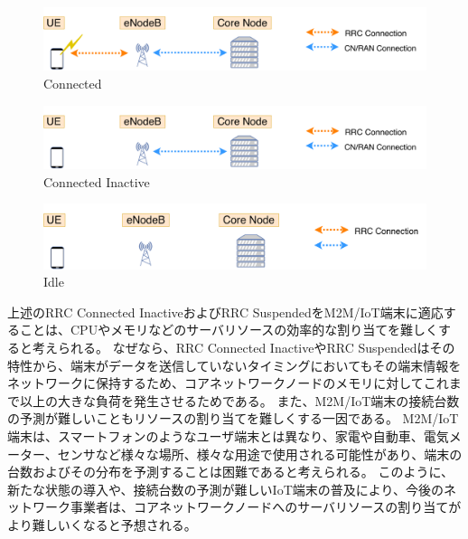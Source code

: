 \documentclass[a4j]{ujarticle}
\begin{document}
\begin{figure}[htbp]
	\centering
	\includegraphics[width=0.7\hsize]{Connected.pdf}
  \caption{Connected}
	\label{Connected}
\end{figure}

\begin{figure}[htbp]
	\centering
	\includegraphics[width=0.7\hsize]{Connected_Inactive.pdf}
  \caption{Connected Inactive}
	\label{Connected Inactive}
\end{figure}

\begin{figure}[htbp]
	\centering
	\includegraphics[width=0.7\hsize]{Idle.pdf}
  \caption{Idle}
	\label{Idle}
\end{figure}
\clearpage

上述のRRC Connected InactiveおよびRRC SuspendedをM2M/IoT端末に適応することは、CPUやメモリなどのサーバリソースの効率的な割り当てを難しくすると考えられる。
なぜなら、RRC Connected InactiveやRRC Suspendedはその特性から、端末がデータを送信していないタイミングにおいてもその端末情報をネットワークに保持するため、コアネットワークノードのメモリに対してこれまで以上の大きな負荷を発生させるためである。
また、M2M/IoT端末の接続台数の予測が難しいこともリソースの割り当てを難しくする一因である。
M2M/IoT端末は、スマートフォンのようなユーザ端末とは異なり、家電や自動車、電気メーター、センサなど様々な場所、様々な用途で使用される可能性があり、端末の台数およびその分布を予測することは困難であると考えられる。
このように、新たな状態の導入や、接続台数の予測が難しいIoT端末の普及により、今後のネットワーク事業者は、コアネットワークノードへのサーバリソースの割り当てがより難しいくなると予想される。
\end{document}
